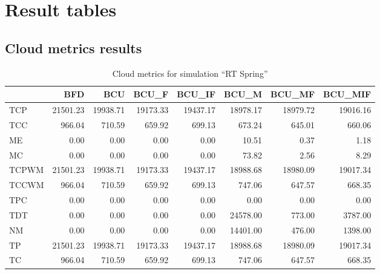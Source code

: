 

\section{Result tables} \label{sec:app_result_simulation_tables}



\subsection{Cloud metrics results}

\begin{table}[ht]
\centering
\begin{tabular}{lrrrrrrr}
\toprule
{} &       BFD &       BCU &     BCU\_F &    BCU\_IF &     BCU\_M &    BCU\_MF &   BCU\_MIF \\
\midrule
TCP   &  21501.23 &  19938.71 &  19173.33 &  19437.17 &  18978.17 &  18979.72 &  19016.16 \\
TCC   &    966.04 &    710.59 &    659.92 &    699.13 &    673.24 &    645.01 &    660.06 \\
ME    &      0.00 &      0.00 &      0.00 &      0.00 &     10.51 &      0.37 &      1.18 \\
MC    &      0.00 &      0.00 &      0.00 &      0.00 &     73.82 &      2.56 &      8.29 \\
TCPWM &  21501.23 &  19938.71 &  19173.33 &  19437.17 &  18988.68 &  18980.09 &  19017.34 \\
TCCWM &    966.04 &    710.59 &    659.92 &    699.13 &    747.06 &    647.57 &    668.35 \\
TPC   &      0.00 &      0.00 &      0.00 &      0.00 &      0.00 &      0.00 &      0.00 \\
TDT   &      0.00 &      0.00 &      0.00 &      0.00 &  24578.00 &    773.00 &   3787.00 \\
NM    &      0.00 &      0.00 &      0.00 &      0.00 &  14401.00 &    476.00 &   1398.00 \\
TP    &  21501.23 &  19938.71 &  19173.33 &  19437.17 &  18988.68 &  18980.09 &  19017.34 \\
TC    &    966.04 &    710.59 &    659.92 &    699.13 &    747.06 &    647.57 &    668.35 \\
\bottomrule
\end{tabular}
\caption{Cloud metrics for simulation "`RT Spring"'}
\end{table}


